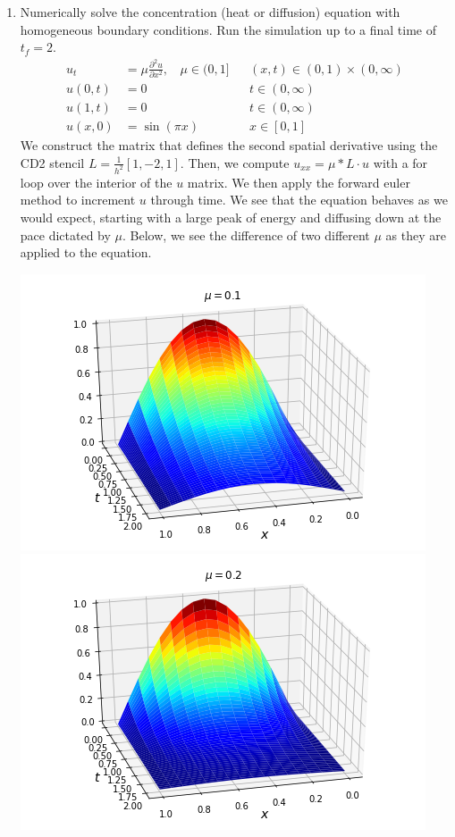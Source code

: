 \documentclass[letterpaper,10pt]{article}
\begin{document}
\begin{enumerate}
\item Numerically solve the concentration (heat or diffusion) equation with homogeneous boundary conditions. Run the simulation up to a final time of $t_f=2$.
\begin{align*}
u_t &= \mu\frac{\partial^2 u}{\partial x^2},\ \ \ \ \mu\in(0,1] && (x,t)\in (0,1)\times (0,\infty) \\
u(0,t)&=0 && t\in (0,\infty)\\
u(1,t)&=0 && t\in (0,\infty)\\
u(x,0)&=\sin(\pi x) && x\in [0,1]
\end{align*}
We construct the matrix that defines the second spatial derivative using the CD2 stencil $L=\frac{1}{h^2}[1,-2,1]$. Then, we compute $u_{xx}=\mu*L\cdot u$ with a for loop over the interior of the $u$ matrix. We then apply the forward euler method to increment $u$ through time. We see that the equation behaves as we would expect, starting with a large peak of energy and diffusing down at the pace dictated by $\mu$. Below, we see the difference of two different $\mu$ as they are applied to the equation.
\begin{center}
\includegraphics[scale=.8]{1mu1.png}
\includegraphics[scale=.8]{1mu2.png}

\end{center}
\end{enumerate}
\end{document}
